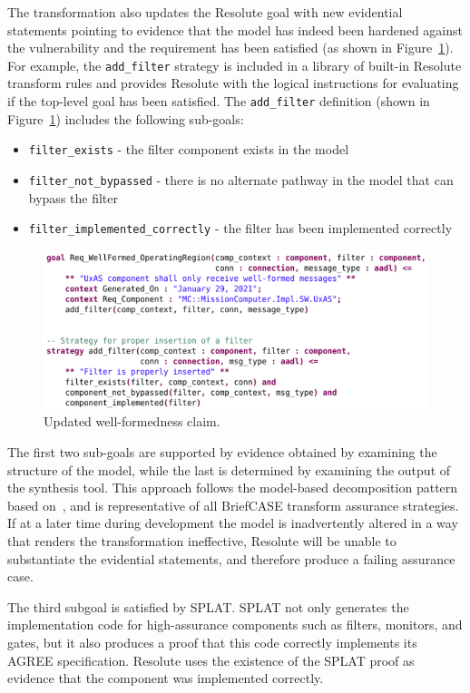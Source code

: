 The transformation also updates the Resolute goal with new evidential statements pointing to evidence that the model has indeed been hardened against the vulnerability and the requirement has been satisfied (as shown in Figure~\ref{fig:resolute-add-filter}).
For example, the \texttt{add\_filter} strategy is included in a library of built-in Resolute transform rules and provides Resolute with the logical instructions for evaluating if the top-level goal has been satisfied.
The \texttt{add\_filter} definition (shown in Figure~\ref{fig:resolute-add-filter}) includes the following sub-goals: 
\begin{itemize}
	\item \texttt{filter\_exists} - the filter component exists in the model
	\item \texttt{filter\_not\_bypassed} -  there is no alternate pathway in the model that can bypass the filter
	\item \texttt{filter\_implemented\_correctly} - the filter has been implemented correctly
\end{itemize}


\begin{figure}[h]
	\centering
	\includegraphics[width=1\columnwidth]{figs/resolute-add-filter.png}
	\caption{Updated well-formedness claim.} 
	\label{fig:resolute-add-filter} 
\end{figure}

The first two sub-goals are supported by evidence obtained by examining the structure of the model, while the last is determined by examining the output of the synthesis tool.  This approach follows the model-based decomposition pattern based on~\cite{model-based-decomposition}, and is representative of all BriefCASE transform assurance strategies.
If at a later time during development the model is inadvertently altered in a way that renders the transformation ineffective, Resolute will be unable to substantiate the evidential statements, and therefore produce a failing assurance case.

The third subgoal is satisfied by SPLAT.  SPLAT not only generates the  implementation code for high-assurance components such as filters, monitors, and gates, but it also produces a proof that this code correctly implements its AGREE specification.  
Resolute uses the existence of the SPLAT proof as evidence that the component was implemented correctly.